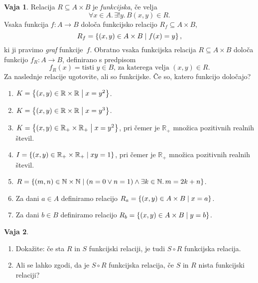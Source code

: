 \documentclass{article}
\newcommand{\all}[1]{\forall #1 .\,}
\newcommand{\some}[1]{\exists #1 .\,}
\newcommand{\exactlyone}[1]{\exists{!} #1 .\,}
\newcommand{\NN}{\mathbb{N}}
\newcommand{\RR}{\mathbb{R}}
\theoremstyle{definition}
\newtheorem{vaja}{Vaja}
\begin{document}
\begin{vaja}
  Relacija $R \subseteq A \times B$ je \emph{funkcijska}, če velja
  \begin{equation*}
    \all{x \in A}{\exactlyone{y}{B}{(x,y) \in R}}.
  \end{equation*}
  Vsaka funkcija $f\colon A \to B$ določa funkcijsko relacijo $R_f
  \subseteq A \times B$,
  \begin{equation*}
    R_f = \set{(x,y) \in A \times B}{f(x) = y},
  \end{equation*}
  ki ji pravimo \emph{graf} funkcije~$f$. Obratno vsaka funkcijska
  relacija $R \subseteq A \times B$ določa funkcijo $f_R\colon A \to B$,
  definirano s predpisom
  \begin{equation*}
    f_R(x) = \text{tisti $y \in B$, za katerega velja $(x,y) \in R$}.
  \end{equation*}
  Za naslednje relacije ugotovite, ali so funkcijske. Če so, katero
  funkcijo določajo?
\begin{enumerate}
  \item $K = \set{(x,y) \in \RR \times \RR}{x = y^2}$.

  \item $K = \set{(x,y) \in \RR \times \RR}{x = y^3}$.

  \item $K = \set{(x,y) \in \RR_{+} \times \RR_{+}}{x =
    y^2}$, pri čemer je $\RR_{+}$ množica pozitivnih realnih števil.

  \item $I = \set{(x,y) \in \RR_{+} \times \RR_{+}}{x y =
    1}$, pri čemer je $\RR_{+}$ množica pozitivnih realnih števil.

  \item $R = \set{(m,n) \in \NN \times \NN}{(n = 0 \lor n = 1) \land \some{k \in \NN}{m = 2 k + n}}$.

  \item Za dani $a \in A$ definiramo relacijo $R_a = \set{(x,y)
    \in A \times B}{x = a}$.


  \item Za dani $b \in B$ definiramo relacijo $R_b = \set{(x,y)
    \in A \times B}{y = b}$.
\end{enumerate}
\end{vaja}

\begin{vaja}
\
\begin{enumerate}
  \item Dokažite: če sta $R$ in $S$ funkcijski relaciji, je tudi $S
  \circ R$ funkcijska relacija.

  \item Ali se lahko zgodi, da je $S \circ R$ funkcijska relacija,
  če $S$ in $R$ nista funkcijski relaciji?  
\end{enumerate}
\end{vaja}
\end{document}
